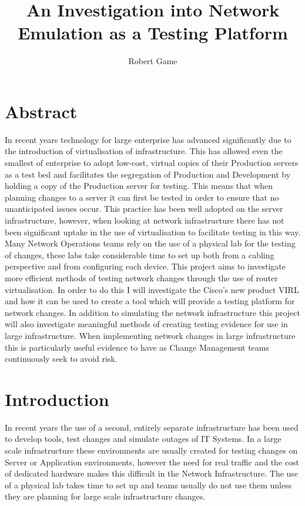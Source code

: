 \documentclass[11pt]{report}
\begin{document}
\title{An Investigation into Network Emulation as a Testing Platform}
\author{Robert Game}
\date{}
\maketitle

\chapter*{Abstract}

In recent years technology for large enterprise has advanced significantly due to the introduction of virtualisation of infrastructure. This has allowed even the smallest of enterprise to adopt low-cost, virtual copies of their Production servers as a test bed and facilitates the segregation of Production and Development by holding a copy of the Production server for testing. This means that when planning changes to a server it can first be tested in order to ensure that no unanticipated issues occur. This practice has been well adopted on the server infrastructure, however, when looking at network infrastructure there has not been significant uptake in the use of virtualisation to facilitate testing in this way. Many Network Operations teams rely on the use of a physical lab for the testing of changes, these labs take considerable time to set up both from a cabling perspective and from configuring each device. This project aims to investigate more efficient methods of testing network changes through the use of router virtualisation. In order to do this I will investigate the Cisco's new product VIRL and how it can be used to create a tool which will provide a testing platform for network changes. In addition to simulating the network infrastructure this project will also investigate meaningful methods of creating testing evidence for use in large infrastructure. When implementing network changes in large infrastructure this is particularly useful evidence to have as Change Management teams continuously seek to avoid risk.

\pagebreak

\tableofcontents

\chapter{Introduction}

In recent years the use of a second, entirely separate infrastructure has been used to develop tools, test changes and simulate outages of IT Systems. In a large scale infrastructure these environments are usually created for testing changes on Server or Application environments, however the need for real traffic and the cost of dedicated hardware makes this difficult in the Network Infrastructure. The use of a physical lab takes time to set up and teams usually do not use them unless they are planning for large scale infrastructure changes.
\end{document}
